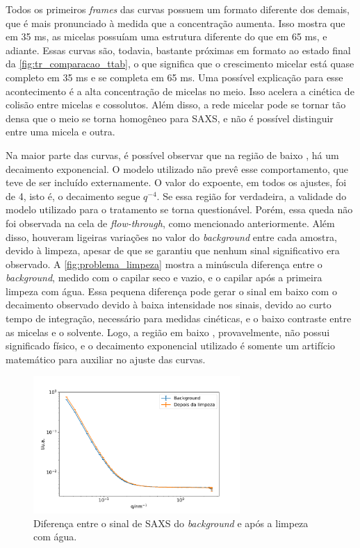 	
	Todos os primeiros \emph{frames} das curvas possuem um formato diferente dos demais, que é mais pronunciado à medida que a concentração aumenta. Isso mostra que em 35 ms, as micelas possuíam uma estrutura diferente do que em 65 ms, e adiante. Essas curvas são, todavia, bastante próximas em formato ao estado final da \autoref{fig:tr_comparacao_ttab}, o que significa que o crescimento micelar está quase completo em 35 ms e se completa em 65 ms. Uma possível explicação para esse acontecimento é a alta concentração de micelas no meio. Isso acelera a cinética de colisão entre micelas e cossolutos. Além disso, a rede micelar pode se tornar tão densa que o meio se torna homogêneo para SAXS, e não é possível distinguir entre uma micela e outra.
	
	Na maior parte das curvas, é possível observar que na região de baixo \q, há um decaimento exponencial. O modelo utilizado não prevê esse comportamento, que teve de ser incluído externamente. O valor do expoente, em todos os ajustes, foi de 4, isto é, o decaimento segue \( q^{-4} \). Se essa região for verdadeira, a validade do modelo utilizado para o tratamento se torna questionável. Porém, essa queda não foi observada na cela de \emph{flow-through}, como mencionado anteriormente. Além disso, houveram ligeiras variações no valor do \emph{background} entre cada amostra, devido à limpeza, apesar de que se garantiu que nenhum sinal significativo era observado. A \autoref{fig:problema_limpeza} mostra a minúscula diferença entre o \emph{background}, medido com o capilar seco e vazio, e o capilar após a primeira limpeza com água. Essa pequena diferença pode gerar o sinal em baixo \q{} com o decaimento observado devido à baixa intensidade nos sinais, devido ao curto tempo de integração, necessário para medidas cinéticas, e o baixo contraste entre as micelas e o solvente. Logo, a região em baixo \q{}, provavelmente, não possui significado físico, e o decaimento exponencial utilizado é somente um artifício matemático para auxiliar no ajuste das curvas.
	
	\begin{figure}[h]
		\centering
		\includegraphics[width=0.7\textwidth]{imagens/saxs/problema_limpeza}
		\caption{Diferença entre o sinal de SAXS do \emph{background} e após a limpeza com água.}
		\label{fig:problema_limpeza}
	\end{figure}

